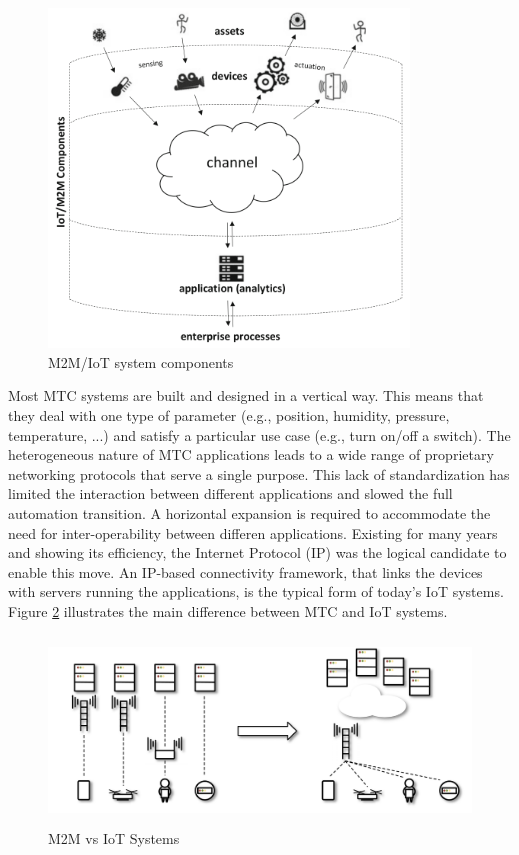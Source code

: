 \documentclass[]{IEEEtran}
\begin{document}
\begin{figure}
\centerline{\includegraphics[width=\linewidth,height=9cm]{Pictures/IoT Components.png}}
\caption{M2M/IoT system components}
\label{fig:IoT_components}
\end{figure}

Most MTC systems are built and designed in a vertical way. This means that they deal with one type of parameter (e.g., position, humidity, pressure, temperature, ...) and satisfy a particular use case (e.g., turn on/off a switch). The heterogeneous nature of MTC applications leads to a wide range of proprietary networking protocols that serve a single purpose. This lack of standardization has limited the interaction between different applications and slowed the full automation transition. A horizontal expansion is required to accommodate the need for inter-operability between differen applications. Existing for many years and showing its efficiency, the Internet Protocol (IP) was the logical candidate to enable this move. An IP-based connectivity framework, that links the devices with servers running the applications, is the typical form of today's IoT systems. Figure \ref{fig:M2M_vs_IoT} illustrates the main difference between MTC and IoT systems.
\begin{figure}
\centerline{\includegraphics[width=\linewidth,height=5cm]{Pictures/M2M to IoT.png}}
\caption{M2M vs IoT Systems}
\label{fig:M2M_vs_IoT}
\end{figure}
\end{document}
